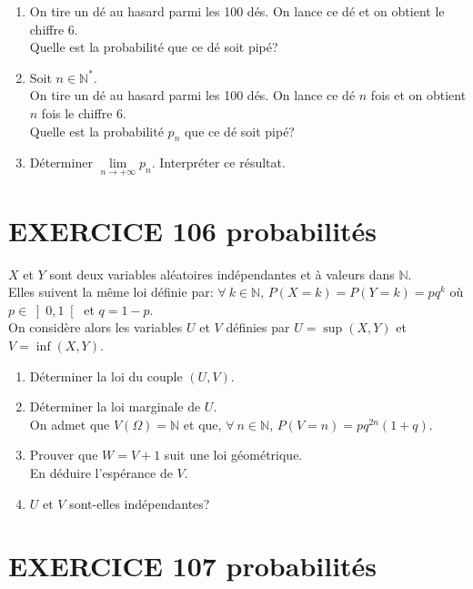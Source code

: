 \documentclass[10pt,oneside]{article}
\begin{document}
\begin{flushleft}
\begin{enumerate}
\begin{enumerate}
\item
On tire un dé au hasard parmi les 100 dés. On lance ce dé  et on obtient le chiffre 6.\\
Quelle est la probabilité que ce dé soit pipé?
\item 
Soit $n\in\mathbb{N}^*.$ \\
On tire un dé au hasard parmi les 100 dés. On lance ce dé $n$ fois et on obtient $n$ fois le chiffre $6$.\\
Quelle est la probabilité $p_n$ que ce dé soit pipé?
\item
Déterminer $\lim\limits_{n\to+\infty}^{}p_n$. Interpréter ce résultat.
\end{enumerate}
\end{enumerate}

\section*{EXERCICE 106 \:probabilités}


 $X$ et $Y$ sont deux variables aléatoires indépendantes et à valeurs dans $\mathbb{N}$.\\
Elles suivent la même loi définie par:  
$\forall\:k\in\mathbb{N}$, $P(X=k)=P(Y=k)=pq^k$ où    $p \in \left] 0,1\right[ $ et $q=1-p$.\\
On considère alors les variables $U$ et $V$ définies par $U=\sup(X,Y)$ et $V=\inf(X,Y)$.
\begin{enumerate}
\item
Déterminer la loi du couple $(U,V)$.
\item
Déterminer la loi marginale de $U$.\\
On admet que $V(\Omega)=\mathbb{N}$ et que, $\forall\:n\in\mathbb{N}$, $P(V=n)=pq^{2n}(1+q)$.
\item
Prouver que $W=V+1$ suit une loi géométrique.\\
En déduire l'espérance de $V$.
\item
$U$ et $V$ sont-elles indépendantes?

\end{enumerate}

\section*{EXERCICE 107 \:probabilités}


\end{flushleft}
\end{document}
